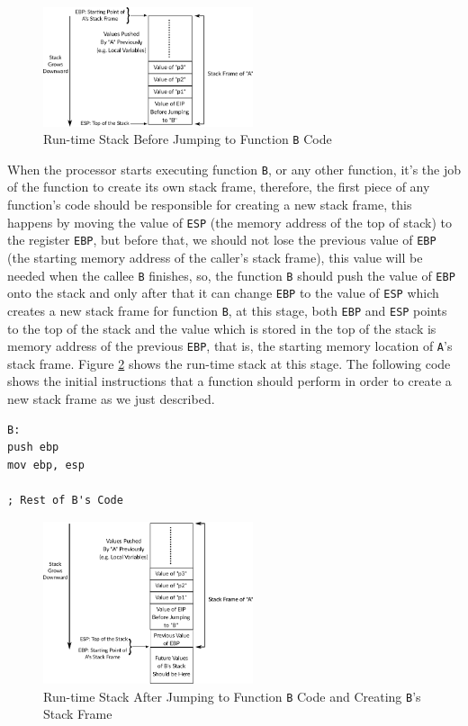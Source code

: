 \begin{figure}
\centering
\includegraphics[width=0.55000\textwidth]{Figures/x86-ch/call-conv-1.png}
\caption{Run-time Stack Before Jumping to Function \lstinline!B!
Code}\label{fig:call-conv-1}
\end{figure}

When the processor starts executing function \lstinline!B!, or any other
function, it's the job of the function to create its own stack frame,
therefore, the first piece of any function's code should be responsible
for creating a new stack frame, this happens by moving the value of
\lstinline!ESP! (the memory address of the top of stack) to the register
\lstinline!EBP!, but before that, we should not lose the previous value
of \lstinline!EBP! (the starting memory address of the caller's stack
frame), this value will be needed when the callee \lstinline!B!
finishes, so, the function \lstinline!B! should push the value of
\lstinline!EBP! onto the stack and only after that it can change
\lstinline!EBP! to the value of \lstinline!ESP! which creates a new
stack frame for function \lstinline!B!, at this stage, both
\lstinline!EBP! and \lstinline!ESP! points to the top of the stack and
the value which is stored in the top of the stack is memory address of
the previous \lstinline!EBP!, that is, the starting memory location of
\lstinline!A!'s stack frame. Figure \ref{fig:call-conv-2} shows the
run-time stack at this stage. The following code shows the initial
instructions that a function should perform in order to create a new
stack frame as we just described.

\begin{lstlisting}
B:
push ebp
mov ebp, esp

; Rest of B's Code
\end{lstlisting}

\begin{figure}
\centering
\includegraphics[width=0.55000\textwidth]{Figures/x86-ch/call-conv-2.png}
\caption{Run-time Stack After Jumping to Function \lstinline!B! Code and
Creating \lstinline!B!'s Stack Frame}\label{fig:call-conv-2}
\end{figure}

